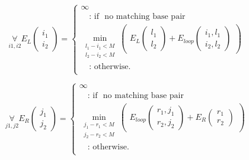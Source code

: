 \begin{equation*}
\underset{i1, i2}{\forall}
E_L(\substack{i_1\\i_2}) = \begin{cases}
\infty\\
\quad\text{: if } \text{ no matching base pair }\\
\min\limits_{\substack{l_{1} - i_{1} < M\\l_{2} - i_{2} < M}}
\begin{pmatrix}
E_L(\substack{l_1\\l_2}) + E_{loop}(\substack{i_1,l_1\\i_2,l_2})
\end{pmatrix}\\
\quad\text{: otherwise.}\\

\end{cases}
\end{equation*}

\begin{equation*}
\underset{j1, j2}{\forall}
E_R(\substack{j_1\\j_2}) = \begin{cases}
\infty\\
\quad\text{: if } \text{ no matching base pair }\\
\min\limits_{\substack{j_{1}-r_{1} < M\\j_{2}-r_{2} < M}}
\begin{pmatrix}
E_{loop}(\substack{r_1,j_1\\r_2,j_2}) + E_R(\substack{r_1\\r_2})
\end{pmatrix}\\
\quad\text{: otherwise.}\\

\end{cases}
\end{equation*}

